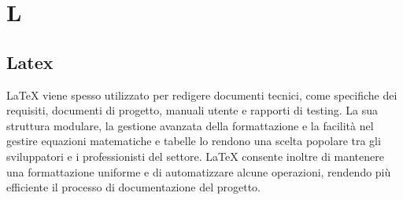 \section*{L}
\subsection*{Latex}
LaTeX viene spesso utilizzato per redigere documenti tecnici, come specifiche
dei requisiti, documenti di progetto, manuali utente e rapporti di testing. La
sua struttura modulare, la gestione avanzata della formattazione e la facilità
nel gestire equazioni matematiche e tabelle lo rendono una scelta popolare tra
gli sviluppatori e i professionisti del settore. LaTeX consente inoltre di
mantenere una formattazione uniforme e di automatizzare alcune operazioni,
rendendo più efficiente il processo di documentazione del progetto.
